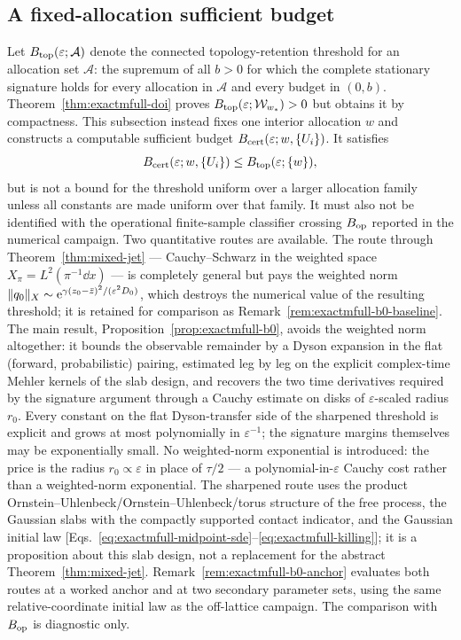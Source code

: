 
\subsection{A fixed-allocation sufficient budget}
\label{subsec:exactmfull-b0}

Let \(B_{\rm top}(\varepsilon;\mathcal A)\) denote the connected
topology-retention threshold for an allocation set \(\mathcal A\): the
supremum of all \(b>0\) for which the complete stationary signature holds for
every allocation in \(\mathcal A\) and every budget in \((0,b)\).
Theorem~\ref{thm:exactmfull-doi} proves
\(B_{\rm top}(\varepsilon;\mathcal W_{w_*})>0\) but obtains it by compactness.
This subsection instead fixes one interior allocation \(w\) and constructs a
computable sufficient budget \(B_{\rm cert}(\varepsilon;w,\{U_i\})\).  It
satisfies
\begin{equation}
 B_{\rm cert}(\varepsilon;w,\{U_i\})
 \le B_{\rm top}(\varepsilon;\{w\}),
 \label{eq:exactmfull-bcert-relation}
\end{equation}
but is not a bound for the threshold uniform over a larger allocation family
unless all constants are made uniform over that family.  It must also not be
identified with the operational finite-sample classifier crossing
\(B_{\rm op}\) reported in the numerical campaign.  Two
quantitative routes are available.  The route through
Theorem~\ref{thm:mixed-jet} --- Cauchy--Schwarz in the weighted space
\(X_\pi=L^2(\pi^{-1}\dd x)\) --- is completely general but pays the weighted
norm \(\|q_0\|_X\sim\mathrm e^{\gamma(z_0-\bar z)^2/(\varepsilon^2D_0)}\), which
destroys the numerical value of the resulting threshold; it is retained for
comparison as Remark~\ref{rem:exactmfull-b0-baseline}.  The main result,
Proposition~\ref{prop:exactmfull-b0}, avoids the weighted norm altogether:
it bounds the observable remainder by a Dyson expansion in the flat
(forward, probabilistic) pairing, estimated leg by leg on the explicit
complex-time Mehler kernels of the slab design, and recovers the two time
derivatives required by the signature argument through a Cauchy estimate on
disks of \(\varepsilon\)-scaled radius \(r_0\).  Every constant on the flat
Dyson-transfer side of the sharpened threshold is explicit and grows at most
polynomially in \(\varepsilon^{-1}\); the signature margins themselves may be
exponentially small.  No weighted-norm exponential is introduced: the price is
the radius \(r_0\propto\varepsilon\) in place of \(\tau/2\) --- a
polynomial-in-\(\varepsilon\) Cauchy cost rather than a weighted-norm
exponential.  The sharpened route uses
the product Ornstein--Uhlenbeck/Ornstein--Uhlenbeck/torus structure of the
free process, the Gaussian slabs with the compactly supported contact
indicator, and the Gaussian initial law
[Eqs.~\eqref{eq:exactmfull-midpoint-sde}--\eqref{eq:exactmfull-killing}];
it is a proposition about this slab design, not a replacement for the
abstract Theorem~\ref{thm:mixed-jet}.
Remark~\ref{rem:exactmfull-b0-anchor} evaluates both routes at a worked
anchor and at two secondary parameter sets, using the same relative-coordinate
initial law as the off-lattice campaign.  The comparison with \(B_{\rm op}\)
is diagnostic only.

